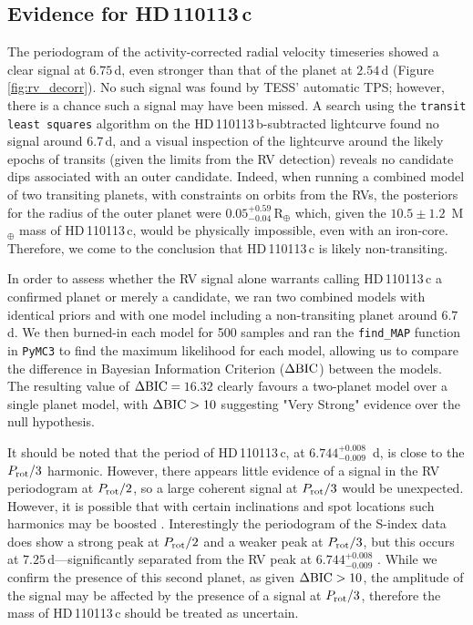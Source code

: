 \documentclass[fleqn,usenatbib]{mnras}
\newcommand{\rearth}{R$_{\oplus}$}
\newcommand{\mearth}{M$_{\oplus}$}
\newcommand{\TPone}{ $ 6.744^{+0.008}_{-0.009} $ }
\newcommand{\TMpone}{ $ 10.5 \pm 1.2 $ }
\newcommand{\Tplanet}{HD\,110113\,b}
\newcommand{\Tplanetc}{HD\,110113\,c}
\newcommand{\TdeltaBIC}{$16.32$}
\begin{document}
\subsection{Evidence for \Tplanetc{}}\label{sect:planetc}
The periodogram of the activity-corrected radial velocity timeseries showed a clear signal at $6.75$\,d, even stronger than that of the planet at $2.54$\,d (Figure \ref{fig:rv_decorr}).
No such signal was found by TESS' automatic TPS; however, there is a chance such a signal may have been missed.
A search using the \texttt{transit least squares} algorithm \citep{hippke2019optimized} on the \Tplanet{}-subtracted lightcurve found no signal around 6.7\,d, and a visual inspection of the lightcurve around the likely epochs of transits (given the limits from the RV detection) reveals no candidate dips associated with an outer candidate.
Indeed, when running a combined model of two transiting planets, with constraints on orbits from the RVs, the posteriors for the radius of the outer planet were $0.05^{+0.59}_{-0.04}$\,\rearth{} which, given the \TMpone{}\,\mearth{} mass of \Tplanetc{}, would be physically impossible, even with an iron-core.
Therefore, we come to the conclusion that \Tplanetc{} is likely non-transiting.

In order to assess whether the RV signal alone warrants calling \Tplanetc{} a confirmed planet or merely a candidate, we ran two combined models with identical priors and with one model including a non-transiting planet around $6.7$d.
We then burned-in each model for 500 samples and ran the \texttt{find\_MAP} function in \texttt{PyMC3} to find the maximum likelihood for each model, allowing us to compare the difference in Bayesian Information Criterion ($\Delta{\rm BIC}$) between the models.
The resulting value of $\Delta{\rm BIC}= $\,\TdeltaBIC{} clearly favours a two-planet model over a single planet model, with $\Delta{\rm BIC}>10$ suggesting "Very Strong" evidence over the null hypothesis. 

It should be noted that the period of \Tplanetc{}, at \TPone{}\,d, is close to the $P_{\rm rot}/3$ harmonic.
However, there appears little evidence of a signal in the RV periodogram at $P_{\rm rot}/2$, so a large coherent signal at $P_{\rm rot}/3$ would be unexpected.
However, it is possible that with certain inclinations and spot locations such harmonics may be boosted \citep{vanderburg2016radial,boisse2011disentangling}.
Interestingly the periodogram of the S-index data does show a strong peak at $P_{\rm rot}/2$ and a weaker peak at $P_{\rm rot}/3$, but this occurs at $7.25$\,d---significantly separated from the RV peak at \TPone{}.
While we confirm the presence of this second planet, as given $\Delta{\rm BIC}>10$, the amplitude of the signal may be affected by the presence of a signal at $P_{\rm rot}/3$, therefore the mass of \Tplanetc{} should be treated as uncertain. 
\end{document}
